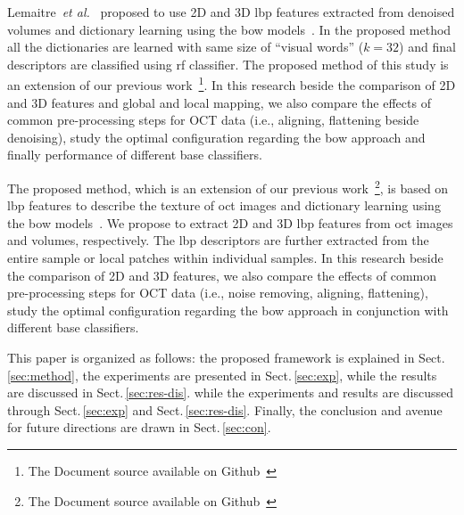{\color{red}Lemaitre~\emph{et al.}~\cite{Lemaintre2015miccaiOCT} proposed to use 2D and 3D \ac{lbp} features extracted from denoised volumes and dictionary learning using the \ac{bow} models~\cite{Sivic2003}.
In the proposed method all the dictionaries are learned with same size of ``visual words'' ($k = 32$) and final descriptors are classified using \ac{rf} classifier.
The proposed method of this study is an extension of our previous work~\cite{Lemaintre2015miccaiOCT}\footnote{The Document source available on Github~\cite{Lemaitre2015}}.
In this research beside the comparison of 2D and 3D features and global and local mapping, we also compare the effects of common pre-processing steps for OCT data (i.e., aligning, flattening beside denoising), study the optimal configuration regarding the \ac{bow} approach and finally performance of different base classifiers.}
 
The proposed method, which is an extension of our previous work~\cite{Lemaintre2015miccaiOCT}\footnote{The Document source available on Github~\cite{Lemaitre2015}}, is based on \ac{lbp} features to describe the texture of \ac{oct} images and dictionary learning using the \ac{bow} models~\cite{Sivic2003}. 
We propose to extract 2D and 3D \ac{lbp} features from \ac{oct} images and volumes, respectively. 
The \ac{lbp} descriptors are further extracted from the entire sample or local patches within individual samples. 
In this research beside the comparison of 2D and 3D features, we also compare the effects of common pre-processing steps for OCT data (i.e., noise removing, aligning, flattening), study the optimal configuration regarding the \ac{bow} approach in conjunction with different base classifiers.
 
This paper is organized as follows: the proposed framework is explained in Sect.\,\ref{sec:method}, the experiments are presented in Sect.\,\ref{sec:exp}, while the results are discussed in Sect.\,\ref{sec:res-dis}.
{\color{red}while the experiments and results are discussed through Sect.\,\ref{sec:exp} and Sect.\,\ref{sec:res-dis}.}
Finally, the conclusion and avenue for future directions are drawn in Sect.\,\ref{sec:con}.


